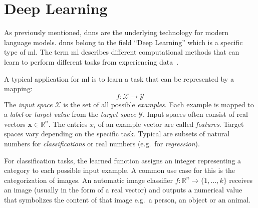 



\clearpage


\section{Deep Learning}\label{sec:deep-learning}
As previously mentioned, \glspl{dnn} are the underlying technology for modern language models.
\glspl{dnn} belong to the field \enquote{Deep Learning} which is a specific type of \gls{ml}.
The term \acrlong{ml} describes different computational methods that can learn to perform different tasks from experiencing data~\autocite{Goodfellow-et-al-2016}.

A typical application for \gls{ml} is to learn a task that can be represented by a mapping:
\[
    f: \mathcal{X} \rightarrow \mathcal{Y}
\]
The \textit{input space} $\mathcal{X}$ is the set of all possible \textit{examples}.
Each example is mapped to a \textit{label} or \textit{target value} from the \textit{target space} $\mathcal{Y}$.
Input spaces often consist of real vectors $\boldsymbol{x} \in \mathbb{R}^n$.
The entries $x_i$ of an example vector are called \textit{features}.
Target spaces vary depending on the specific task.
Typical are subsets of natural numbers for \textit{classifications} or real numbers (e.g.\ for \textit{regression}).

For classification tasks, the learned function assigns an integer representing a category to each possible input example.
A common use case for this is the categorization of images.
An automatic image classifier $f:\mathbb{R}^n \rightarrow \{1,\dots,k\}$ receives an image (usually in the form of a real vector) and outputs a numerical value that symbolizes the content of that image e.g.\ a person, an object or an animal.

